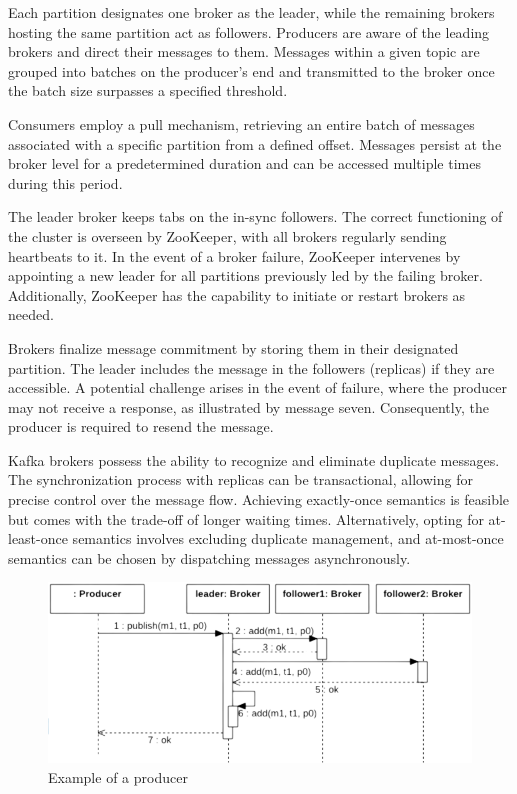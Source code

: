 Each partition designates one broker as the leader, while the remaining brokers hosting the same partition act as followers. 
Producers are aware of the leading brokers and direct their messages to them. 
Messages within a given topic are grouped into batches on the producer's end and transmitted to the broker once the batch size surpasses a specified threshold.

Consumers employ a pull mechanism, retrieving an entire batch of messages associated with a specific partition from a defined offset. 
Messages persist at the broker level for a predetermined duration and can be accessed multiple times during this period.

The leader broker keeps tabs on the in-sync followers. 
The correct functioning of the cluster is overseen by ZooKeeper, with all brokers regularly sending heartbeats to it. 
In the event of a broker failure, ZooKeeper intervenes by appointing a new leader for all partitions previously led by the failing broker. 
Additionally, ZooKeeper has the capability to initiate or restart brokers as needed.

Brokers finalize message commitment by storing them in their designated partition. 
The leader includes the message in the followers (replicas) if they are accessible. 
A potential challenge arises in the event of failure, where the producer may not receive a response, as illustrated by message seven. 
Consequently, the producer is required to resend the message.

Kafka brokers possess the ability to recognize and eliminate duplicate messages. 
The synchronization process with replicas can be transactional, allowing for precise control over the message flow. 
Achieving exactly-once semantics is feasible but comes with the trade-off of longer waiting times. 
Alternatively, opting for at-least-once semantics involves excluding duplicate management, and at-most-once semantics can be chosen by dispatching messages asynchronously.
\begin{figure}[H]
    \centering
    \includegraphics[width=0.5\linewidth]{images/producer.png}
    \caption{Example of a producer}
\end{figure}

